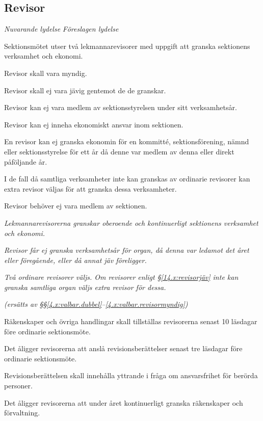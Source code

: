 \documentclass{article}
\newenvironment{lydelse}
    {\begin{paracol}{2}%
        \emph{Nuvarande lydelse}%
        \switchcolumn%
        \emph{Föreslagen lydelse}%
    \end{paracol}%
    \begin{enumerate}[label=\thesubsection.\arabic*]%
    \begin{paracol}{2}%
    }{\end{paracol}\end{enumerate}}
\begin{document}
\subsection{Revisor}
\begin{lydelse}
  \setcounter{section}{13}
  \setcounter{subsection}{1}
  \item Sektionsmötet utser två lekmannarevisorer med uppgift att granska sektionens verksamhet och ekonomi.
  \item Revisor skall vara myndig.
  \item Revisor skall ej vara jävig gentemot de de granskar.
  \item Revisor kan ej vara medlem av sektionsstyrelsen under sitt verksamhetsår.
  \item Revisor kan ej inneha ekonomiskt ansvar inom sektionen.
  \item En revisor kan ej granska ekonomin för en kommitté, sektionsförening, nämnd eller sektionsstyrelse för ett år då denne var medlem av denna eller direkt påföljande år.
  \item I de fall då samtliga verksamheter inte kan granskas av ordinarie revisorer kan extra revisor väljas för att granska dessa verksamheter.
  \item Revisor behöver ej vara medlem av sektionen.
 
  \switchcolumn
  \setcounter{enumi}{0}  
  \item \emph{Lekmannarevisorerna granskar oberoende och kontinuerligt sektionens verksamhet och ekonomi.}

  \item \emph{Revisor får ej granska verksamhetsår för organ, då denna var ledamot det året eller föregående, eller då annat jäv föreligger.} \label{14.x:revisorjäv}

  \item \emph{Två ordinare revisorer väljs. Om revisorer enligt \S\ref{14.x:revisorjäv} inte kan granska samtliga organ väljs extra revisor för dessa.}

  \item[] \emph{(ersätts av \S\S\ref{4.x:valbar.dubbel}--\ref{4.x:valbar.revisormyndig})}

  \switchcolumn*
  \item Räkenskaper och övriga handlingar skall tillställas revisorerna senast 10 läsdagar före ordinarie sektionsmöte.
    \setcounter{subsection}{1}
    \setcounter{enumi}{0}  
  \item Det åligger revisorerna att anslå revisionsberättelser senast tre läsdagar före ordinarie sektionsmöte.
  \item Revisionsberättelsen skall innehålla yttrande i fråga om ansvarsfrihet för berörda personer.
  \item Det åligger revisorerna att under året kontinuerligt granska räkenskaper och förvaltning.
 

\end{lydelse}
\end{document}
